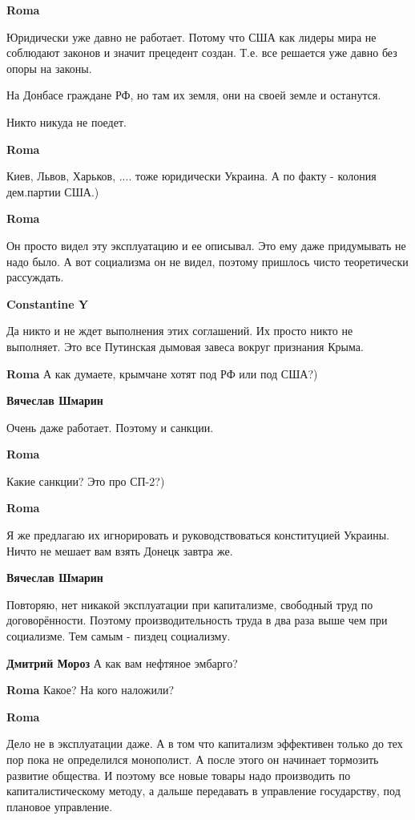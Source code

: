\begin{itemize}
\textbf{Roma}

Юридически уже давно не работает. Потому что США как лидеры мира не соблюдают
законов и значит прецедент создан. Т.е. все решается уже давно без опоры на
законы. 

На Донбасе граждане РФ, но там их земля, они на своей земле и останутся. 

Никто никуда не поедет.

\textbf{Roma}

Киев, Львов, Харьков, .... тоже юридически Украина. А по факту - колония дем.партии США.)

\textbf{Roma}

Он просто видел эту эксплуатацию и ее описывал. Это ему даже придумывать не
надо было. А вот социализма он не видел, поэтому пришлось чисто теоретически
рассуждать.

\textbf{Constantine Y}

Да никто и не ждет выполнения этих соглашений. Их просто никто не выполняет.
Это все Путинская дымовая завеса вокруг признания Крыма.

\textbf{Roma}
А как думаете, крымчане хотят под РФ или под США?)

\textbf{Вячеслав Шмарин}

Очень даже работает. Поэтому и санкции.

\textbf{Roma}

Какие санкции? Это про СП-2?)

\textbf{Roma}

Я же предлагаю их игнорировать и руководствоваться конституцией Украины. Ничто
не мешает вам взять Донецк завтра же.

\textbf{Вячеслав Шмарин}

Повторяю, нет никакой эксплуатации при капитализме, свободный труд по
договорённости. Поэтому производительность труда в два раза выше чем при
социализме. Тем самым - пиздец социализму.

\textbf{Дмитрий Мороз}
А как вам нефтяное эмбарго?

\textbf{Roma}
Какое? На кого наложили?

\textbf{Roma}

Дело не в эксплуатации даже. А в том что капитализм эффективен только до тех
пор пока не определился монополист. А после этого он начинает тормозить
развитие общества. И поэтому все новые товары надо производить по
капиталистическому методу, а дальше передавать в управление государству, под
плановое управление.


\end{itemize}
